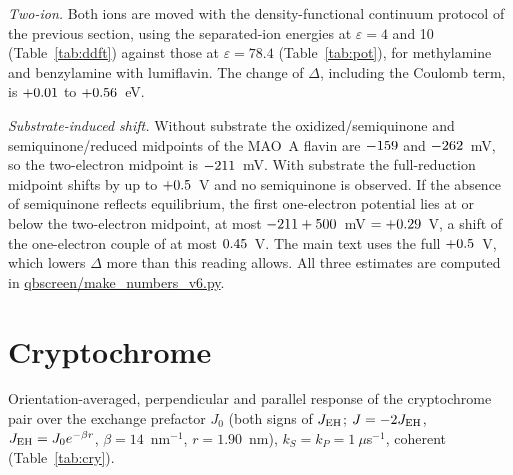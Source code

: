 \documentclass[11pt]{article}
\begin{document}
\emph{Two-ion.} Both ions are moved with the density-functional continuum
protocol of the previous section, using the separated-ion energies at
$\varepsilon = 4$ and 10 (Table~\ref{tab:ddft}) against those at
$\varepsilon = 78.4$ (Table~\ref{tab:pot}), for methylamine and benzylamine with
lumiflavin. The change of $\Delta$, including the Coulomb term, is $+0.01$ to
$+0.56$~eV.

\emph{Substrate-induced shift.} Without substrate the oxidized/semiquinone and
semiquinone/reduced midpoints of the MAO~A flavin are $-159$ and
$-262$~mV,\cite{Sablin2001} so the two-electron midpoint is $-211$~mV.
With substrate the full-reduction midpoint shifts by up to $+0.5$~V and no
semiquinone is observed.\cite{Sablin2001} If the absence of semiquinone reflects
equilibrium, the first one-electron potential lies at or below the two-electron
midpoint, at most $-211+500$~mV${}=+0.29$~V, a shift of the one-electron
couple of at most $0.45$~V. The main text uses the full
$+0.5$~V, which lowers $\Delta$ more than this reading allows. All three
estimates are computed in \url{qbscreen/make_numbers_v6.py}.

\section{Cryptochrome}
Orientation-averaged, perpendicular and parallel response of the cryptochrome
pair over the exchange prefactor $J_0$ (both signs of $J_{\rm EH}$;
$J = -2J_{\rm EH}$, $J_{\rm EH} = J_0e^{-\beta r}$, $\beta = 14$~nm$^{-1}$,
$r = 1.90$~nm\cite{Efimova2008}), $k_S = k_P = 1~\mu$s$^{-1}$, coherent
(Table~\ref{tab:cry}).

\begin{table}[h]
\caption{Cryptochrome response (\%).}
\label{tab:cry}
\centering

\end{table}



\end{document}
